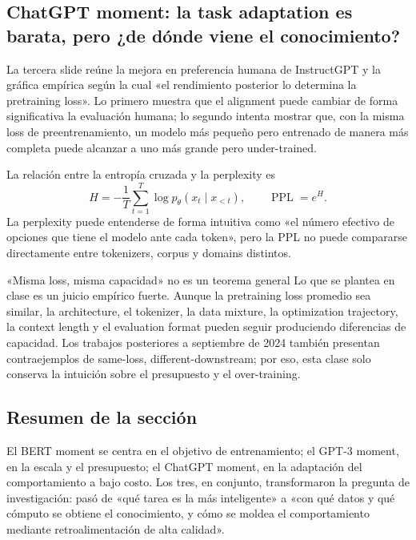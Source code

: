 \subsection{ChatGPT moment: la task adaptation es barata, pero ¿de dónde viene el conocimiento?}

La tercera slide reúne la mejora en preferencia humana de InstructGPT y la gráfica empírica según la cual «el rendimiento posterior lo determina la pretraining loss». Lo primero muestra que el alignment puede cambiar de forma significativa la evaluación humana; lo segundo intenta mostrar que, con la misma loss de preentrenamiento, un modelo más pequeño pero entrenado de manera más completa puede alcanzar a uno más grande pero under-trained.


La relación entre la entropía cruzada y la perplexity es
\[
H=-\frac{1}{T}\sum_{t=1}^{T}\log p_\theta(x_t\mid x_{<t}),
\qquad
\operatorname{PPL}=e^H.
\]
La perplexity puede entenderse de forma intuitiva como «el número efectivo de opciones que tiene el modelo ante cada token», pero la PPL no puede compararse directamente entre tokenizers, corpus y domains distintos.

\begin{warningbox}{«Misma loss, misma capacidad» no es un teorema general}
Lo que se plantea en clase es un juicio empírico fuerte. Aunque la pretraining loss promedio sea similar, la architecture, el tokenizer, la data mixture, la optimization trajectory, la context length y el evaluation format pueden seguir produciendo diferencias de capacidad. Los trabajos posteriores a septiembre de 2024 también presentan contraejemplos de same-loss, different-downstream; por eso, esta clase solo conserva la intuición sobre el presupuesto y el over-training.
\end{warningbox}


\subsection{Resumen de la sección}

El BERT moment se centra en el objetivo de entrenamiento; el GPT-3 moment, en la escala y el presupuesto; el ChatGPT moment, en la adaptación del comportamiento a bajo costo. Los tres, en conjunto, transformaron la pregunta de investigación: pasó de «qué tarea es la más inteligente» a «con qué datos y qué cómputo se obtiene el conocimiento, y cómo se moldea el comportamiento mediante retroalimentación de alta calidad».

